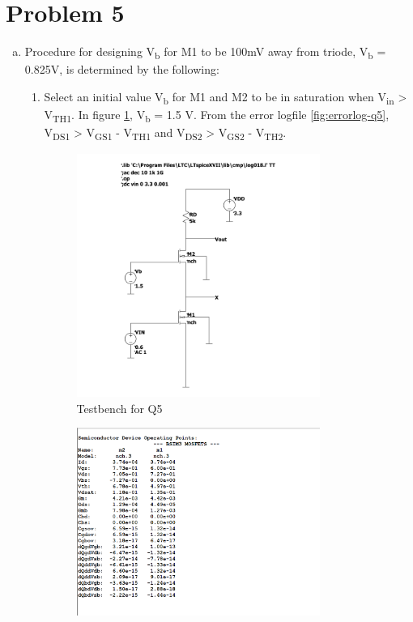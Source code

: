 \documentclass{article}
\begin{document}
\section{Problem 5}
\label{sec:org29f663b}
\begin{enumerate}[(a)]
\item Procedure for designing V\textsubscript{b} for M1 to be 100mV away from triode, V\textsubscript{b} = 0.825V, is determined by the following:
\begin{enumerate}[1.]
\item Select an initial value V\textsubscript{b} for M1 and M2 to be in saturation when V\textsubscript{in} > V\textsubscript{TH1}. In figure \ref{fig:testbench-q5}, V\textsubscript{b} = 1.5 V.
From the error logfile \ref{fig:errorlog-q5}, V\textsubscript{DS1} > V\textsubscript{GS1} - V\textsubscript{TH1} and V\textsubscript{DS2} > V\textsubscript{GS2} - V\textsubscript{TH2}.
\begin{figure}[H]
\centering
\includegraphics[width=300px]{img/q5/testbench-q5.pdf}
\caption{\label{fig:testbench-q5}Testbench for Q5}
\end{figure}
\begin{figure}[H]
\centering
\includegraphics[width=300px]{img/q5/errorlog-q5.png}

\end{figure}
\end{enumerate}
\end{enumerate}
\end{document}
